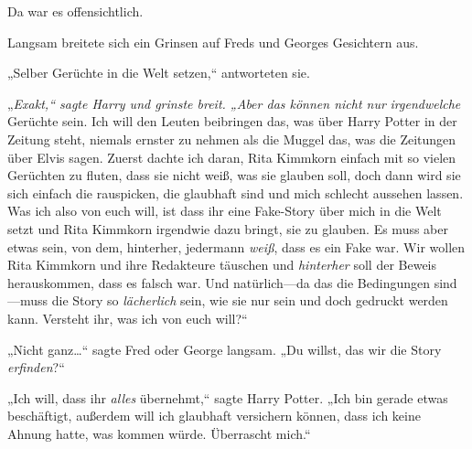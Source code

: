 Da war es offensichtlich.

Langsam breitete sich ein Grinsen auf Freds und Georges Gesichtern aus.

„Selber Gerüchte in die Welt setzen,“ antworteten sie.

„\emph{Exakt,“ sagte Harry und grinste breit. „Aber das können nicht nur} \emph{irgendwelche} Gerüchte sein. Ich will den Leuten beibringen das, was über Harry Potter in der Zeitung steht, niemals ernster zu nehmen als die Muggel das, was die Zeitungen über Elvis sagen. Zuerst dachte ich daran, Rita Kimmkorn einfach mit so vielen Gerüchten zu fluten, dass sie nicht weiß, was sie glauben soll, doch dann wird sie sich einfach die rauspicken, die glaubhaft sind und mich schlecht aussehen lassen. Was ich also von euch will, ist dass ihr eine Fake-Story über mich in die Welt setzt und Rita Kimmkorn irgendwie dazu bringt, sie zu glauben. Es muss aber etwas sein, von dem, hinterher, jedermann \emph{weiß}, dass es ein Fake war. Wir wollen Rita Kimmkorn und ihre Redakteure täuschen und \emph{hinterher} soll der Beweis herauskommen, dass es falsch war. Und natürlich—da das die Bedingungen sind—muss die Story so \emph{lächerlich} sein, wie sie nur sein und doch gedruckt werden kann. Versteht ihr, was ich von euch will?“

„Nicht ganz…“ sagte Fred oder George langsam. „Du willst, das wir die Story \emph{erfinden}?“

„Ich will, dass ihr \emph{alles} übernehmt,“ sagte Harry Potter. „Ich bin gerade etwas beschäftigt, außerdem will ich glaubhaft versichern können, dass ich keine Ahnung hatte, was kommen würde. Überrascht mich.“

